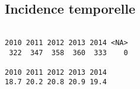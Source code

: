 \documentclass[11pt,a4paper]{article}\usepackage[]{graphicx}\usepackage[]{color}
\makeatletter
\newenvironment{kframe}{%
 \def\at@end@of@kframe{}%
 \ifinner\ifhmode%
  \def\at@end@of@kframe{\end{minipage}}%
  \begin{minipage}{\columnwidth}%
 \fi\fi%
 \def\FrameCommand##1{\hskip\@totalleftmargin \hskip-\fboxsep
 \colorbox{shadecolor}{##1}\hskip-\fboxsep
     \hskip-\linewidth \hskip-\@totalleftmargin \hskip\columnwidth}%
 \MakeFramed {\advance\hsize-\width
   \@totalleftmargin\z@ \linewidth\hsize
   \@setminipage}}%
 {\par\unskip\endMakeFramed%
 \at@end@of@kframe}
\newenvironment{knitrout}{}{} %
\makeatother
\begin{document}
  \subsection{Incidence temporelle}

\begin{knitrout}
\color{fgcolor}\begin{kframe}
\begin{verbatim}

2010 2011 2012 2013 2014 <NA> 
 322  347  358  360  333    0 

2010 2011 2012 2013 2014 
18.7 20.2 20.8 20.9 19.4 
\end{verbatim}
\end{kframe}
\end{knitrout}
\end{document}
